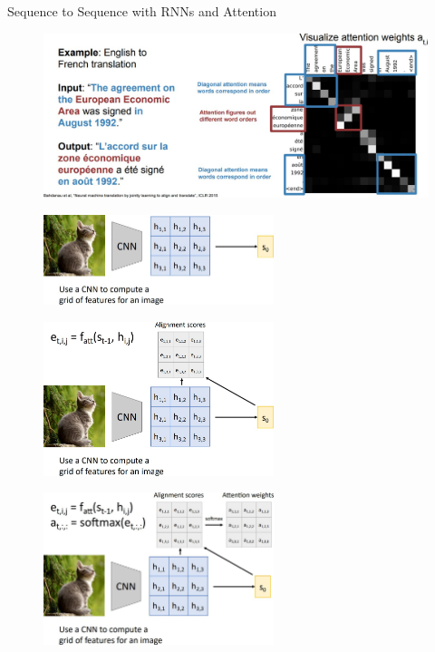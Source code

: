 \begin{frame}[allowframebreaks]{Sequence to Sequence with RNNs and Attention}
    \framebreak

    \begin{figure}
        \centering
        \includegraphics[width=1\textwidth,keepaspectratio]{images/rnn/slide_23_1_img.jpg}
    \end{figure}

    \framebreak

    \begin{figure}
        \flushleft
        \includegraphics[width=0.6\textwidth,keepaspectratio]{images/rnn/slide_24_1_img.jpg}
    \end{figure}

    \framebreak

    \begin{figure}
        \flushleft
        \includegraphics[width=0.6\textwidth,keepaspectratio]{images/rnn/slide_25_1_img.jpg}
    \end{figure}

    \framebreak

    \begin{figure}
        \flushleft
        \includegraphics[width=0.6\textwidth,keepaspectratio]{images/rnn/slide_26_1_img.jpg}
    \end{figure}


\end{frame}
